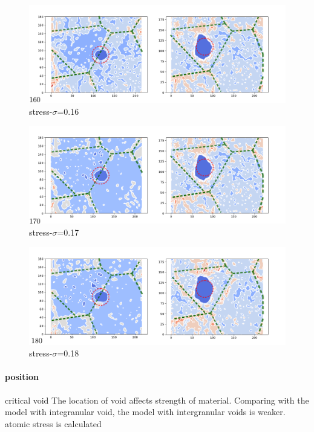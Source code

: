 \documentclass[times,12pt]{elsarticle}
\begin{document}
\begin{figure}[h]
	\centering
	\includegraphics[width=0.7\linewidth]{img/frame160}
	\caption{stress-$\sigma$=0.16}
	\label{ }
\end{figure}

\begin{figure}[h]
	\centering
	\includegraphics[width=0.7\linewidth]{img/frame170}
	\caption{stress-$\sigma$=0.17}
	\label{ }
\end{figure}


\begin{figure}[h]
	\centering
	\includegraphics[width=0.7\linewidth]{img/frame180}
	\caption{stress-$\sigma$=0.18}
	\label{ }
\end{figure}
\paragraph{position}critical void 
The location of void affects strength of material. Comparing with the model with integranular void, the model with intergranular voids is weaker. atomic stress is calculated 





% 
\end{document}
